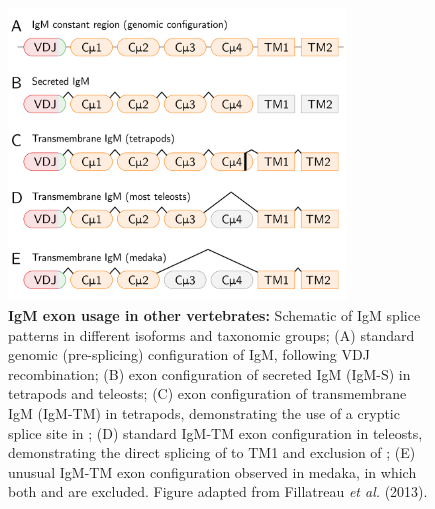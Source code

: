 	
	\begin{figure}
	\centering
		    \begin{subfigure}{0em}
        \label{fig:teleost-igm-exons-a}
    \end{subfigure}
    \begin{subfigure}{0em}
        \label{fig:teleost-igm-exons-b}
    \end{subfigure}
    \begin{subfigure}{0em}
        \label{fig:teleost-igm-exons-c}
    \end{subfigure}
    \begin{subfigure}{0em}
        \label{fig:teleost-igm-exons-d}
    \end{subfigure}
    \begin{subfigure}{0em}
        \label{fig:teleost-igm-exons-e}
    \end{subfigure}
	\includegraphics[width=0.8\textwidth]{_Figures/png_edited/teleost-igm-exons}
	\caption[IgM exon usage in other vertebrates]{\textbf{IgM exon usage in other vertebrates:} Schematic of IgM splice patterns in different isoforms and taxonomic groups; (A) standard genomic (pre-splicing) configuration of IgM, following VDJ recombination; (B) exon configuration of secreted IgM (IgM-S) in tetrapods and teleosts; (C) exon configuration of transmembrane IgM (IgM-TM) in tetrapods, demonstrating the use of a cryptic splice site in ; (D) standard IgM-TM exon configuration in teleosts, demonstrating the direct splicing of  to TM1 and exclusion of ; (E) unusual IgM-TM exon configuration observed in medaka, in which both  and  are excluded. Figure adapted from Fillatreau \textit{et al.} (2013).}
	\label{fig:teleost-igm-exons}
	\end{figure}
	
